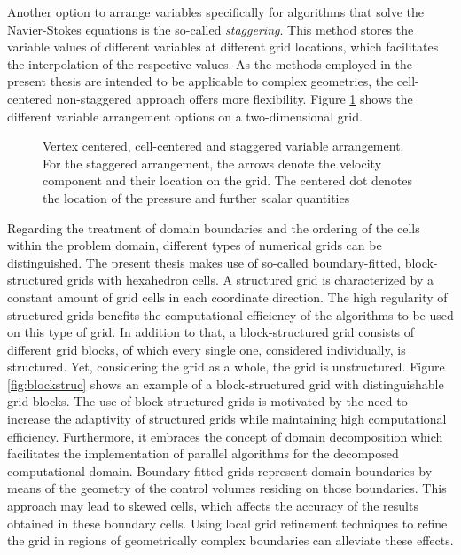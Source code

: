 Another option to arrange variables specifically for algorithms that solve the Navier-Stokes equations is the so-called \emph{staggering}. This method stores the variable values of different variables at different grid locations, which facilitates the interpolation of the respective values. As the methods employed in the present thesis are intended to be applicable to complex geometries, the cell-centered non-staggered approach offers more flexibility. Figure \ref{fig:cellvertex} shows the different variable arrangement options on a two-dimensional grid.

\begin{figure}
    \hfil
    \hfil
    \caption{Vertex centered, cell-centered and staggered variable arrangement. For the staggered arrangement, the arrows denote the velocity component and their location on the grid. The centered dot denotes the location of the pressure and further scalar quantities}
   \label{fig:cellvertex}
\end{figure}

Regarding the treatment of domain boundaries and the ordering of the cells within the problem domain, different types of numerical grids can be distinguished. The present thesis makes use of so-called boundary-fitted, block-structured grids with hexahedron cells. A structured grid is characterized by a constant amount of grid cells in each coordinate direction. The high regularity of structured grids benefits the computational efficiency of the algorithms to be used on this type of grid. In addition to that, a block-structured grid consists of different grid blocks, of which every single one, considered individually, is structured. Yet, considering the grid as a whole, the grid is unstructured. Figure \ref{fig:blockstruc} shows an example of a block-structured grid with distinguishable grid blocks. The use of block-structured grids is motivated by the need to increase the adaptivity of structured grids while maintaining high computational efficiency. Furthermore, it embraces the concept of domain decomposition which facilitates the implementation of parallel algorithms for the decomposed computational domain. Boundary-fitted grids represent domain boundaries by means of the geometry of the control volumes residing on those boundaries. This approach may lead to skewed cells, which affects the accuracy of the results obtained in these boundary cells. Using local grid refinement techniques to refine the grid in regions of geometrically complex boundaries can alleviate these effects.

